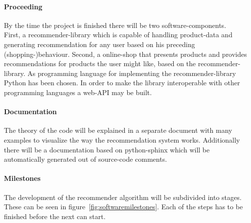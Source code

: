 \paragraph{Proceeding}
By the time the project is finished there will be two software-components.\\
First, a recommender-library which is capable of handling product-data and generating recommendation for any user based on his preceding (shopping-)behaviour.
Second, a online-shop that presents products and provides recommendations for products the user might like, based on the recommender-library.
As programming language for implementing the recommender-library Python has been chosen.
In order to make the library interoperable with other programming languages a web-API may be built.

\paragraph{Documentation}
The theory of the code will be explained in a separate document with many examples to visualize the way the recommendation system works.
Additionally there will be a documentation based on python-sphinx which will be automatically generated out of source-code comments.

\paragraph{Milestones}
The development of the recommender algorithm will be subdivided into stages.
These can be seen in figure~\ref{fig:softwaremilestones}.
Each of the steps has to be finished before the next can start.\\

